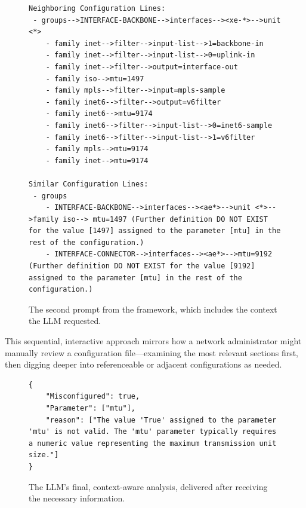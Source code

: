 \begin{figure}[t]
    \centering
    \begin{mdframed}
    \begin{lstlisting}[basicstyle=\tiny\ttfamily, breaklines=true,postbreak=\mbox{\textcolor{red}{$\hookrightarrow$}\space}]
Neighboring Configuration Lines:
 - groups-->INTERFACE-BACKBONE-->interfaces--><xe-*>-->unit <*>
    - family inet-->filter-->input-list-->1=backbone-in
    - family inet-->filter-->input-list-->0=uplink-in
    - family inet-->filter-->output=interface-out
    - family iso-->mtu=1497
    - family mpls-->filter-->input=mpls-sample
    - family inet6-->filter-->output=v6filter
    - family inet6-->mtu=9174
    - family inet6-->filter-->input-list-->0=inet6-sample
    - family inet6-->filter-->input-list-->1=v6filter
    - family mpls-->mtu=9174
    - family inet-->mtu=9174

Similar Configuration Lines:
 - groups
    - INTERFACE-BACKBONE-->interfaces--><ae*>-->unit <*>-->family iso--> mtu=1497 (Further definition DO NOT EXIST for the value [1497] assigned to the parameter [mtu] in the rest of the configuration.)
    - INTERFACE-CONNECTOR-->interfaces--><ae*>-->mtu=9192 (Further definition DO NOT EXIST for the value [9192] assigned to the parameter [mtu] in the rest of the configuration.)
    \end{lstlisting}
    \end{mdframed}
    \caption{The second prompt from the framework, which includes the context the LLM requested.}
    \label{fig:step3_context_provision}
\end{figure}


This sequential, interactive approach mirrors how a network administrator might manually review a configuration file—examining the most relevant sections first, then digging deeper into referenceable or adjacent configurations as needed.


\begin{figure}[t]
    \centering
    \begin{mdframed}
    \begin{lstlisting}[basicstyle=\small\tiny\ttfamily, breaklines=true,postbreak=\mbox{\textcolor{red}{$\hookrightarrow$}\space}]
{
    "Misconfigured": true,
    "Parameter": ["mtu"],
    "reason": ["The value 'True' assigned to the parameter 'mtu' is not valid. The 'mtu' parameter typically requires a numeric value representing the maximum transmission unit size."]
}
    \end{lstlisting}
    \end{mdframed}
    \caption{The LLM's final, context-aware analysis, delivered after receiving the necessary information.}
    \label{fig:step4_final_analysis}
\end{figure}



